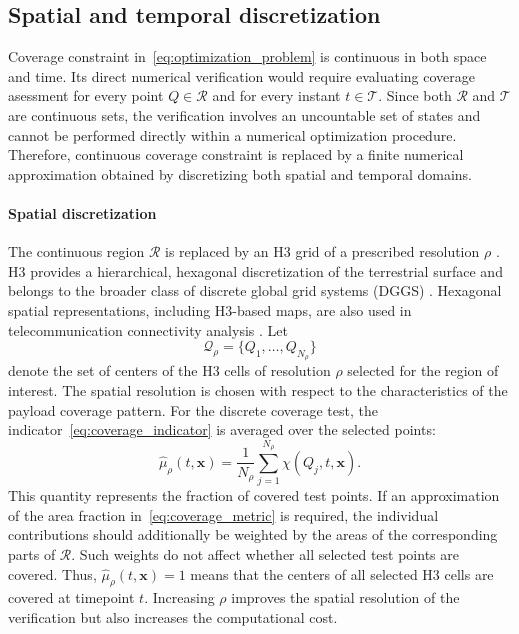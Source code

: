 \subsection{Spatial and temporal discretization}
\label{subsec:coverage_discretization}

Coverage constraint in~\eqref{eq:optimization_problem} is continuous in both space and time. 
Its direct numerical verification would require evaluating coverage asessment for every point 
$Q\in\mathcal{R}$ and for every instant $t\in\mathcal{T}$. Since both $\mathcal{R}$ and $\mathcal{T}$
are continuous sets, the verification involves an uncountable set of states and cannot be 
performed directly within a numerical optimization procedure. Therefore, continuous coverage constraint
is replaced by a finite numerical approximation obtained by discretizing both spatial and temporal domains.

\paragraph{Spatial discretization}

The continuous region $\mathcal{R}$ is replaced by an H3 grid of a prescribed resolution $\rho$ \cite{h3docs}. 
H3 provides a hierarchical, hexagonal discretization of the terrestrial surface and belongs to the broader class 
of discrete global grid systems (DGGS) \cite{sahr2003dggs,ogc_dggs}. Hexagonal spatial representations, including H3-based maps, 
are also used in telecommunication connectivity analysis \cite{itu_e813}.
Let
\begin{equation}
    \mathcal{Q}_{\rho}=\{Q_1,\ldots,Q_{N_{\rho}}\}
    \label{eq:h3_point_set}
\end{equation}
denote the set of centers of the H3 cells of resolution $\rho$ selected for the region of interest. 
The spatial resolution is chosen with respect to the characteristics of the payload coverage pattern. 
For the discrete coverage test, the indicator~\eqref{eq:coverage_indicator} is averaged over the selected points:
\begin{equation}
    \widehat{\mu}_{\rho}(t,\mathbf{x})=
    \frac{1}{N_{\rho}}\sum_{j=1}^{N_{\rho}}
        \chi(Q_j,t,\mathbf{x}).
    \label{eq:discrete_coverage_metric}
\end{equation}
This quantity represents the fraction of covered test points. If an approximation of the area fraction 
in~\eqref{eq:coverage_metric} is required, the individual contributions should additionally be weighted 
by the areas of the corresponding parts of $\mathcal{R}$. Such weights do not affect whether all selected
test points are covered. Thus, $\widehat{\mu}_{\rho}(t,\mathbf{x})=1$ means that the centers of
all selected H3 cells are covered at timepoint $t$. Increasing $\rho$ improves the spatial resolution of the 
verification but also increases the computational cost.

